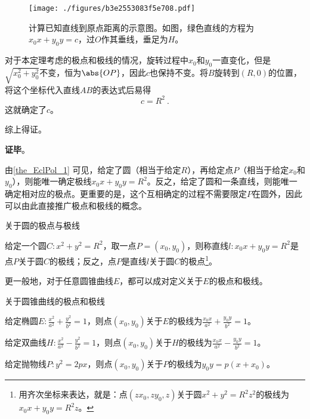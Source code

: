 \begin{figure}[ht]
\centering
\texttt{[image: ./figures/b3e2553083f5e708.pdf]}
\caption{计算已知直线到原点距离的示意图。如图，绿色直线的方程为$x_0x+y_0y=c$，过$O$作其垂线，垂足为$H$。} \label{fig_EclPol_2}
\end{figure}


对于本定理考虑的极点和极线的情况，旋转过程中$x_0$和$y_0$一直变化，但是$\sqrt{x_0^2+y_0^2}$不变，恒为$\abs{OP}$，因此$c$也保持不变。将$B$旋转到$(R, 0)$的位置，将这个坐标代入直线$AB$的表达式后易得
\begin{equation}
c=R^2~. 
\end{equation}
这就确定了$c$。

综上得证。

\textbf{证毕}。



由\autoref{the_EclPol_1} 可见，给定了圆（相当于给定$R$），再给定点$P$（相当于给定$x_0$和$y_0$），则能唯一确定极线$x_0x+y_0y=R^2$。反之，给定了圆和一条直线，则能唯一确定相对应的极点。更重要的是，这个互相确定的过程不需要限定$P$在圆外，因此可以由此直接推广极点和极线的概念。




\begin{definition}{关于圆的极点与极线}\label{def_EclPol_2}

给定一个圆$C: x^2+y^2=R^2$，取一点$P=(x_0, y_0)$，则称直线$l:x_0x+y_0y=R^2$是点$P$关于圆$C$的极线；反之，点$P$是直线$l$关于圆$C$的极点\footnote{用齐次坐标来表达，就是：点$(zx_0, zy_0, z)$关于圆$x^2+y^2=R^2z^2$的极线为$x_0x+y_0y=R^2z$。}。

\end{definition}





更一般地，对于任意圆锥曲线$E$，都可以成对定义关于$E$的极点和极线。



\begin{definition}{关于圆锥曲线的极点和极线}

给定椭圆$E:\frac{x^2}{a^2}+\frac{y^2}{b^2}=1$，则点$(x_0, y_0)$关于$E$的极线为$\frac{x_0x}{a^2}+\frac{y_0y}{b^2}=1$。

给定双曲线$H:\frac{x^2}{a^2}-\frac{y^2}{b^2}=1$，则点$(x_0, y_0)$关于$H$的极线为$\frac{x_0x}{a^2}-\frac{y_0y}{b^2}=1$。

给定抛物线$P:y^2=2px$，则点$(x_0, y_0)$关于$P$的极线为$y_0y=p(x+x_0)$。

\end{definition}




















